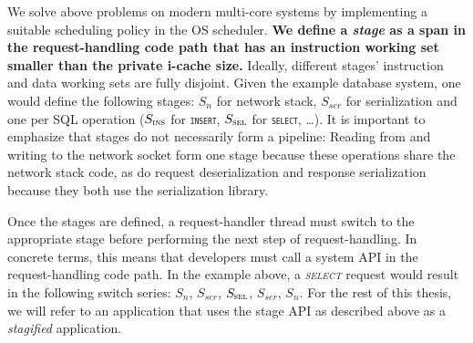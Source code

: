 \documentclass[12pt,a4paper]{book}
\begin{document}
We solve above problems on modern multi-core systems by implementing a suitable scheduling policy in the OS scheduler.
\textbf{We define a \emph{stage} as a span in the request-handling code path that has an instruction working set smaller than the private i-cache size.}
Ideally, different stages' instruction and data working sets are fully disjoint.
Given the example database system, one would define the following stages:
$S_n$ for network stack, $S_{ser}$ for serialization and one per SQL operation ($S_{\textsc{ins}}$ for \texttt{\textsc{insert}}, $S_{\textsc{sel}}$ for \texttt{\textsc{select}}, \dots).
It is important to emphasize that stages do not necessarily form a pipeline:
Reading from and writing to the network socket form one stage because these operations share the network stack code, as do request deserialization and response serialization because they both use the serialization library.

Once the stages are defined, a request-handler thread must switch to the appropriate stage before performing the next step of request-handling.
In concrete terms, this means that developers must call a system API in the request-handling code path.
In the example above, a \textit{\textsc{select}} request would result in the following switch series: $S_n$, $S_{ser}$, $S_{\textsc{sel}}$, $S_{ser}$, $S_n$.
For the rest of this thesis, we will refer to an application that uses the stage API as described above as a \emph{stagified} application.

\end{document}
